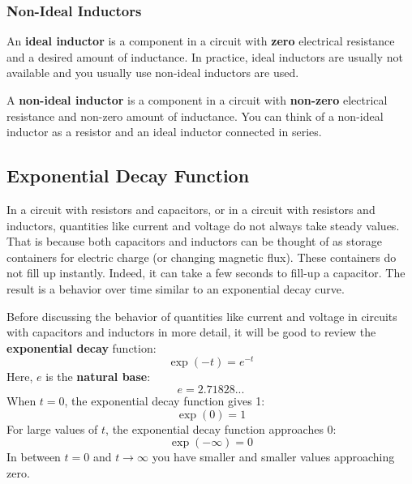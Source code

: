 \subsubsection{Non-Ideal Inductors}
An \textbf{ideal inductor} is a component in a circuit with \textbf{zero} electrical resistance and a desired amount of inductance. In practice, ideal inductors are usually not available and you usually use non-ideal inductors are used.

A \textbf{non-ideal inductor} is a component in a circuit with \textbf{non-zero} electrical resistance and non-zero amount of inductance. You can think of a non-ideal inductor as a resistor and an ideal inductor connected in series.
\subsection{Exponential Decay Function}
In a circuit with resistors and capacitors, or in a circuit with resistors and inductors, quantities like current and voltage do not always take steady values. That is because both capacitors and inductors can be thought of as storage containers for electric charge (or changing magnetic flux). These containers do not fill up instantly. Indeed, it can take a few seconds to fill-up a capacitor. The result is a behavior over time similar to an exponential decay curve.

Before discussing the behavior of quantities like current and voltage in circuits with capacitors and inductors in more detail, it will be good to review the \textbf{exponential decay} function:
\begin{equation}
    \exp(-t) = e^{-t}
\end{equation}
Here, $e$ is the \textbf{natural base}:
\begin{equation}
    e = 2.71828...
\end{equation}
When $t = 0$, the exponential decay function gives 1:
\begin{equation}
    \exp(0) = 1
\end{equation}
For large values of $t$, the exponential decay function approaches 0:
\begin{equation}
    \exp(-\infty) = 0
\end{equation}
In between $t = 0$ and $t \rightarrow \infty$ you have smaller and smaller values approaching zero.

